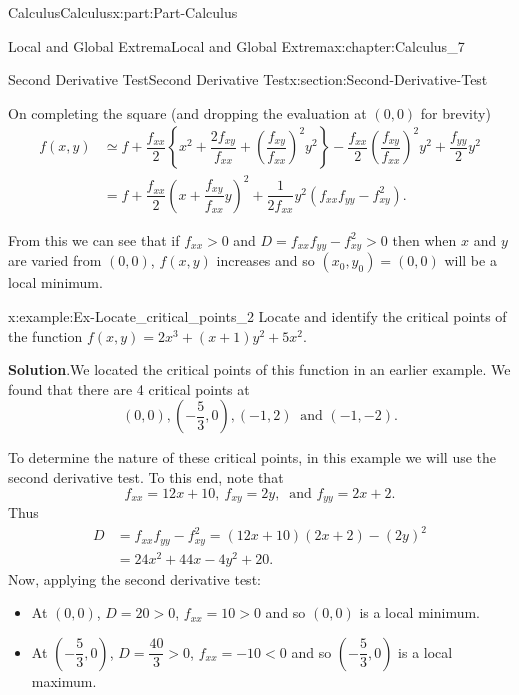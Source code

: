 \documentclass[oneside,10pt,]{book}
\newcommand{\blocktitlefont}{\relax}
\numberwithin{equation}{section}
\newcommand{\amp}{&}
\begin{document}
\begin{partptx}{Calculus}{}{Calculus}{}{}{x:part:Part-Calculus}
\begin{chapterptx}{Local and Global Extrema}{}{Local and Global Extrema}{}{}{x:chapter:Calculus_7}
\begin{sectionptx}{Second Derivative Test}{}{Second Derivative Test}{}{}{x:section:Second-Derivative-Test}
\begin{equation*}
\end{equation*}
%
\par
On completing the square (and dropping the evaluation at \((0,0)\) for brevity)%
\begin{align*}
f(x,y) \amp \simeq f + \dfrac{f_{xx}}{2} \left \{x^2 + \dfrac{2f_{xy}}{f_{xx}} + \left( \dfrac{f_{xy}}{f_{xx}} \right)^2 y^2 \right \} - \dfrac{f_{xx}}{2} \left( \dfrac{f_{xy}}{f_{xx}} \right)^2 y^2 + \dfrac{f_{yy}}{2}y^2\\
\amp = f + \dfrac{f_{xx}}{2} \left( x + \dfrac{f_{xy}}{f_{xx}} y \right)^2 + \dfrac{1}{2 f_{xx}} y^2 \left( f_{xx} f_{yy} - f_{xy}^2 \right)\text{.}
\end{align*}
%
\par
From this we can see that if \(f_{xx} > 0\) and \(D = f_{xx} f_{yy} - f_{xy}^2 > 0\) then when \(x\) and \(y\) are varied from \((0,0)\), \(f(x,y)\) increases and so \((x_0,y_0) = (0,0)\) will be a local minimum.%
\begin{example}{}{x:example:Ex-Locate_critical_points_2}%
Locate and identify the critical points of the function \(f(x,y) = 2x^3 + (x+1)y^2 + 5x^2\).%
\par\smallskip%
\noindent\textbf{\blocktitlefont Solution}.\hypertarget{g:solution:id552652}{}\quad{}We located the critical points of this function in an earlier example. We found that there are 4 critical points at%
\begin{equation*}
\left( 0, 0 \right), \left( -\dfrac{5}{3}, 0 \right), \left( -1, 2 \right) \: \text{ and } \left( -1, -2 \right)\text{.}
\end{equation*}
%
\par
To determine the nature of these critical points, in this example we will use the second derivative test. To this end, note that%
\begin{equation*}
f_{xx} = 12x+10, \: f_{xy} = 2y, \: \text{ and } f_{yy} = 2x+2\text{.}
\end{equation*}
Thus%
\begin{align*}
D \amp = f_{xx} f_{yy} - f_{xy}^2 = (12x+10)(2x+2) - (2y)^2\\
\amp = 24x^2 + 44x -4y^2+20\text{.}
\end{align*}
Now, applying the second derivative test:%
\par
%
\begin{itemize}[label=\textbullet]
\item{}At \((0,0)\), \(D=20>0\), \(f_{xx}=10>0\) and so \((0,0)\) is a local minimum.%
\item{}At \((-\dfrac{5}{3},0)\), \(D=\dfrac{40}{3}>0\), \(f_{xx}=-10 < 0\) and so \((-\dfrac{5}{3},0)\) is a local maximum.%

\end{itemize}
\end{example}
\end{sectionptx}
\end{chapterptx}
\end{partptx}
\end{document}

